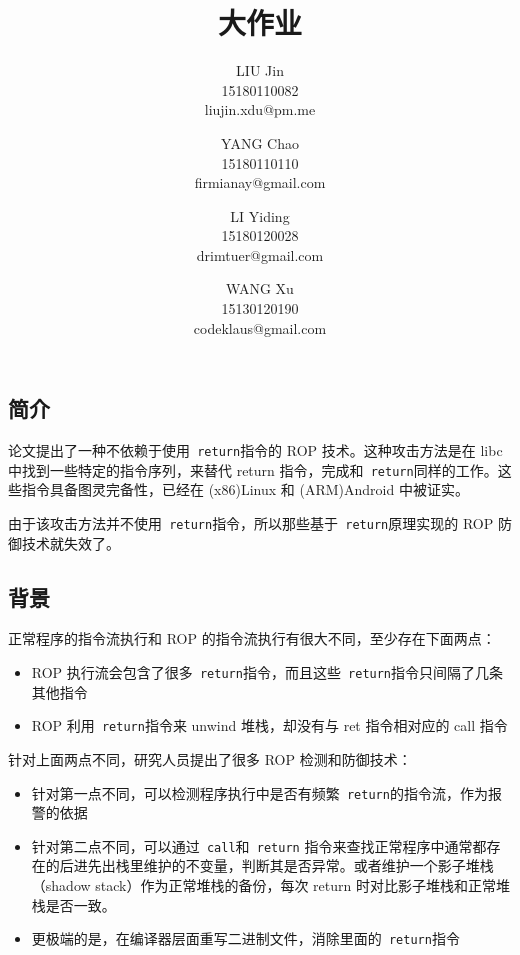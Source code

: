 \documentclass{article}
\title{\classname{} 大作业}
\author{LIU Jin\\
15180110082 \\
\small{liujin.xdu@pm.me} \and
YANG Chao\\
15180110110 \\
\small{firmianay@gmail.com} \and
LI Yiding\\
15180120028 \\
\small{drimtuer@gmail.com} \and
WANG Xu\\
15130120190 \\
\small{codeklaus@gmail.com}
}
\begin{document}
\maketitle

\renewcommand{\contentsname}{目录}

\newpage
\tableofcontents
\newpage

\begin{center}
    \section{简介}
\end{center}

\setlength{\parindent}{2em}

论文提出了一种不依赖于使用\verb+ return+指令的 ROP 技术。这种攻击方法是在 libc 中找到一些特定的指令序列，来替代 return 指令，完成和\verb+ return+同样的工作。这些指令具备图灵完备性，已经在 (x86)Linux 和 (ARM)Android 中被证实。

由于该攻击方法并不使用\verb+ return+指令，所以那些基于\verb+ return+原理实现的 ROP 防御技术就失效了。

\newpage

\begin{center}
    \section{背景}
\end{center}

正常程序的指令流执行和 ROP 的指令流执行有很大不同，至少存在下面两点：

\begin{itemize}
    \item ROP 执行流会包含了很多\verb+ return+指令，而且这些\verb+ return+指令只间隔了几条其他指令
    \item ROP 利用\verb+ return+指令来 unwind 堆栈，却没有与 ret 指令相对应的 call 指令
\end{itemize}

针对上面两点不同，研究人员提出了很多 ROP 检测和防御技术：
\begin{itemize}
    \item 针对第一点不同，可以检测程序执行中是否有频繁\verb+ return+的指令流，作为报警的依据
    \item 针对第二点不同，可以通过\verb+ call+和\verb+ return+ 指令来查找正常程序中通常都存在的后进先出栈里维护的不变量，判断其是否异常。或者维护一个影子堆栈（shadow stack）作为正常堆栈的备份，每次 return 时对比影子堆栈和正常堆栈是否一致。
    \item 更极端的是，在编译器层面重写二进制文件，消除里面的\verb+ return+指令
\end{itemize}
\end{document}
